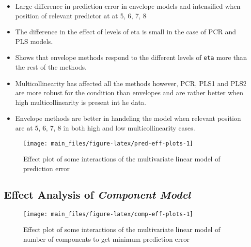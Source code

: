 \documentclass[12pt,3p,authoryear]{elsarticle}
\begin{document}
\begin{itemize}
\item
  Large difference in prediction error in envelope models and
  intensified when position of relevant predictor at at 5, 6, 7, 8
\item
  The difference in the effect of levels of eta is small in the case of
  PCR and PLS models.
\item
  Shows that envelope methods respond to the different levels of
  \texttt{eta} more than the rest of the methods.
\item
  Multicollinearity has affected all the methods however, PCR, PLS1 and
  PLS2 are more robust for the condition than envelopes and are rather
  better when high multicollinearity is present int he data.
\item
  Envelope methods are better in handeling the model when relevant
  position are at 5, 6, 7, 8 in both high and low multicollinearity
  cases.
\end{itemize}




\begin{figure}
\texttt{[image: main\_files/figure-latex/pred-eff-plots-1]} \caption{Effect plot of some interactions of the multivariate
linear model of prediction error}\label{fig:pred-eff-plots}
\end{figure}

\hypertarget{effect-analysis-of-component-model}{%
\subsection{\texorpdfstring{Effect Analysis of \emph{Component
Model}}{Effect Analysis of Component Model}}\label{effect-analysis-of-component-model}}




\begin{figure}
\texttt{[image: main\_files/figure-latex/comp-eff-plots-1]} \caption{Effect plot of some interactions of the multivariate
linear model of number of components to get minimum prediction error}\label{fig:comp-eff-plots}
\end{figure}
\end{document}
